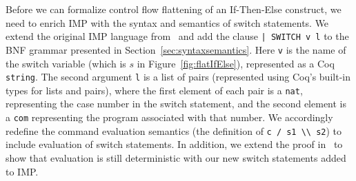 \documentclass[compsoc,conference,a4paper,10pt,times]{IEEEtran}
\newtheorem{theorem}{Theorem}[section]
\begin{document}
%
%
%
Before we can formalize control flow flattening of an If-Then-Else construct, we need to enrich IMP with the syntax and semantics of switch statements. We extend the original IMP language from~\cite{SFV2} and add the clause \texttt{| SWITCH v l} to the BNF grammar presented in Section~\ref{sec:syntaxsemantics}.  Here \texttt{v} is the name of the switch variable (which is $s$ in Figure~\ref{fig:flatIfElse}), represented as a Coq \texttt{string}.  The second argument \texttt{l} is a list of pairs (represented using Coq's built-in types for lists and pairs), where the first element of each pair is a \texttt{nat}, representing the case number in the switch statement, and the second element is a \texttt{com} representing the program associated with that number.
We accordingly redefine the command evaluation semantics (the definition of \verb|c / s1 \\ s2|) to include evaluation of switch statements.  In addition, we extend the proof in~\cite{SFV2} to show that evaluation is still deterministic with our new switch statements added to IMP.


\end{document}

